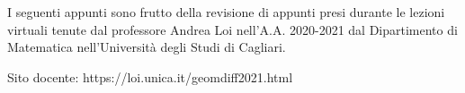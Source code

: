 I seguenti appunti sono frutto della revisione di appunti presi durante le lezioni virtuali tenute dal professore Andrea Loi nell'A.A. 2020-2021 dal Dipartimento di Matematica nell'Università degli Studi di Cagliari.

Sito docente: https://loi.unica.it/geomdiff2021.html